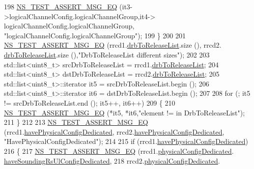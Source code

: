 \begin{DoxyCode}
198       \hyperlink{group__testing_ga2a9d78cffb3db8e867c35fff0b698cf5}{NS\_TEST\_ASSERT\_MSG\_EQ} (it3->logicalChannelConfig.logicalChannelGroup,it4->
      logicalChannelConfig.logicalChannelGroup, \textcolor{stringliteral}{"logicalChannelConfig.logicalChannelGroup"});
199     \}
200 
201   \hyperlink{group__testing_ga2a9d78cffb3db8e867c35fff0b698cf5}{NS\_TEST\_ASSERT\_MSG\_EQ} (rrcd1.\hyperlink{structns3_1_1LteRrcSap_1_1RadioResourceConfigDedicated_a2828f77c993322793cb4b19cf5cf7cd3}{drbToReleaseList}.size (), rrcd2.
      \hyperlink{structns3_1_1LteRrcSap_1_1RadioResourceConfigDedicated_a2828f77c993322793cb4b19cf5cf7cd3}{drbToReleaseList}.size (),\textcolor{stringliteral}{"DrbToReleaseList different sizes"});
202 
203   std::list<uint8\_t> srcDrbToReleaseList = rrcd1.\hyperlink{structns3_1_1LteRrcSap_1_1RadioResourceConfigDedicated_a2828f77c993322793cb4b19cf5cf7cd3}{drbToReleaseList};
204   std::list<uint8\_t> dstDrbToReleaseList = rrcd2.\hyperlink{structns3_1_1LteRrcSap_1_1RadioResourceConfigDedicated_a2828f77c993322793cb4b19cf5cf7cd3}{drbToReleaseList};
205   std::list<uint8\_t>::iterator it5 = srcDrbToReleaseList.begin ();
206   std::list<uint8\_t>::iterator it6 = dstDrbToReleaseList.begin ();
207 
208   \textcolor{keywordflow}{for} (; it5 != srcDrbToReleaseList.end (); it5++, it6++)
209     \{
210       \hyperlink{group__testing_ga2a9d78cffb3db8e867c35fff0b698cf5}{NS\_TEST\_ASSERT\_MSG\_EQ} (*it5, *it6,\textcolor{stringliteral}{"element != in DrbToReleaseList"});
211     \}
212 
213   \hyperlink{group__testing_ga2a9d78cffb3db8e867c35fff0b698cf5}{NS\_TEST\_ASSERT\_MSG\_EQ} (rrcd1.\hyperlink{structns3_1_1LteRrcSap_1_1RadioResourceConfigDedicated_ab86be2addf52373c0edf3545f06a627e}{havePhysicalConfigDedicated},
      rrcd2.\hyperlink{structns3_1_1LteRrcSap_1_1RadioResourceConfigDedicated_ab86be2addf52373c0edf3545f06a627e}{havePhysicalConfigDedicated}, \textcolor{stringliteral}{"HavePhysicalConfigDedicated"});
214 
215   \textcolor{keywordflow}{if} (rrcd1.\hyperlink{structns3_1_1LteRrcSap_1_1RadioResourceConfigDedicated_ab86be2addf52373c0edf3545f06a627e}{havePhysicalConfigDedicated})
216     \{
217       \hyperlink{group__testing_ga2a9d78cffb3db8e867c35fff0b698cf5}{NS\_TEST\_ASSERT\_MSG\_EQ} (rrcd1.\hyperlink{structns3_1_1LteRrcSap_1_1RadioResourceConfigDedicated_a1832a9a12892edeba8a7ddecdfab9b0d}{physicalConfigDedicated}.
      \hyperlink{structns3_1_1LteRrcSap_1_1PhysicalConfigDedicated_ad21dfb2d8802b28f792b889b68c47761}{haveSoundingRsUlConfigDedicated},
218                              rrcd2.\hyperlink{structns3_1_1LteRrcSap_1_1RadioResourceConfigDedicated_a1832a9a12892edeba8a7ddecdfab9b0d}{physicalConfigDedicated}.

\end{DoxyCode}
